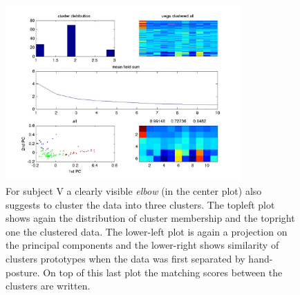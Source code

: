 \begin{figure}[ht]
    \centering
        \includegraphics[width=0.8\textwidth]{images/raw_clusters_vega.jpg}
    \caption{For subject V a clearly visible \emph{elbow} (in the center plot) also suggests to cluster the data into three clusters. The topleft plot shows again the distribution of cluster membership and the topright one the clustered data. The lower-left plot is again a projection on the principal components and the lower-right shows similarity of clusters prototypes when the data was first separated by hand-posture. On top of this last plot the matching scores between the clusters are written.}
    \label{sg:fig:Documents_uni_yifat_lab_results_evoked_syns_raw_clusters_vega}
\end{figure}


